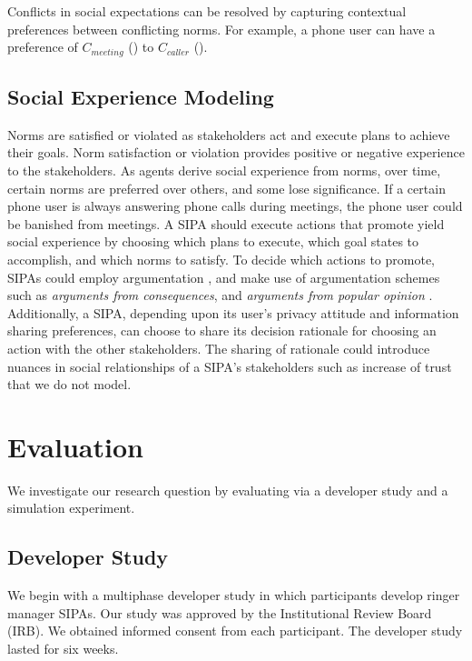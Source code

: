 Conflicts in social expectations can be resolved by capturing contextual 
preferences between conflicting norms. For example, a phone user can have a 
preference of  $C_{meeting}$ ()
to $C_{caller}$ (). 

\subsection{Social Experience Modeling}
Norms are satisfied or violated as stakeholders act and execute plans to
achieve their goals. Norm satisfaction or violation provides positive or
negative experience to the stakeholders. As agents derive social
experience from norms, over time, certain norms are preferred over
others, and some lose significance. If a certain phone user is always
answering phone calls during meetings, the phone user could be banished
from meetings. A SIPA should execute actions that promote yield social
experience by choosing which plans to execute, which goal states to
accomplish, and which norms to satisfy. To decide which actions to
promote, SIPAs could employ argumentation
\citep{BenchCapon-2007-Argumentation+AI}, and make use of argumentation
schemes such as \emph{arguments from consequences}, and \emph{arguments
from popular opinion} \citep{walton2008argumentation}. Additionally, a
SIPA, depending upon its user's privacy attitude and information sharing
preferences, can choose to share its decision rationale for choosing an
action with the other stakeholders. The sharing of rationale could
introduce nuances in social relationships of a SIPA's stakeholders such
as increase of trust that we do not model.



\section{Evaluation}
\label{sec:arnor-experiments}

We investigate our research question by evaluating \frameworkA via a
developer study and a simulation experiment.


\subsection{Developer Study}
\label{sec:devstudy}

We begin with a multiphase developer study in
which participants develop ringer manager SIPAs. Our study was approved
by the Institutional Review Board (IRB). We obtained informed consent
from each participant. The developer study lasted for six weeks.

